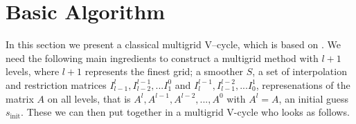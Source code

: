 \documentclass[../draft_1.tex]{subfiles}
\begin{document}
\section{Basic Algorithm} 

In this section we present a classical multigrid V--cycle, which is based on \cite{briggs2000multigrid}.
We need the following main ingredients to construct a multigrid method with $l+1$ levels, where $l+1$ represents the finest grid; a smoother $S$, a set of interpolation and restriction matrices $I_{l-1}^l, I_{l-2}^{l-1}, ...I_1^0$ and $I_{l}^{l-1}, I_{l-1}^{l-2}, ... I_0^1$, represenations of the matrix $A$ on all levels, that is $A^l, A^{l-1}, A^{l-2}, ..., A^0$ with $A^l = A$, an initial guess $s_{\text{init}}$. These we can then put together in a multigrid V-cycle who looks as follows. 
\end{document}

